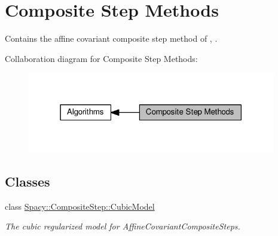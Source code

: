 \hypertarget{group__CSGroup}{}\section{Composite Step Methods}
\label{group__CSGroup}


Contains the affine covariant composite step method of \cite{Lubkoll2015}, \cite{Lubkoll2015a}.  


Collaboration diagram for Composite Step Methods\+:\nopagebreak
\begin{figure}[H]
\begin{center}
\leavevmode
\includegraphics[width=307pt]{group__CSGroup}
\end{center}
\end{figure}
\subsection*{Classes}
\begin{DoxyCompactItemize}
\item 
class \hyperlink{classSpacy_1_1CompositeStep_1_1CubicModel}{Spacy\+::\+Composite\+Step\+::\+Cubic\+Model}
\begin{DoxyCompactList}\small\item\em The cubic regularized model for Affine\+Covariant\+Composite\+Steps. \end{DoxyCompactList}\end{DoxyCompactItemize}
